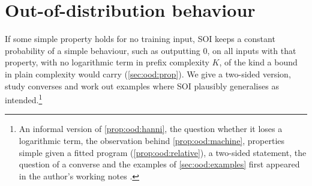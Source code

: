 \section{Out-of-distribution behaviour}\label{sec:ood}

If some simple property holds for no training input, SOI keeps a constant probability of a simple behaviour, such as outputting $0$, on all inputs with that property, with no logarithmic term in prefix complexity $K$, of the kind a bound in plain complexity would carry (\cref{sec:ood:prop}). We give a two-sided version, study converses and work out examples where SOI plausibly generalises as intended.\footnote{An informal version of \cref{prop:ood:hanni}, the question whether it loses a logarithmic term, the observation behind \cref{prop:ood:machine}, properties simple given a fitted program (\cref{prop:ood:relative}), a two-sided statement, the question of a converse and the examples of \cref{sec:ood:examples} first appeared in the author's working notes \citep{hanni2026notes}.}

